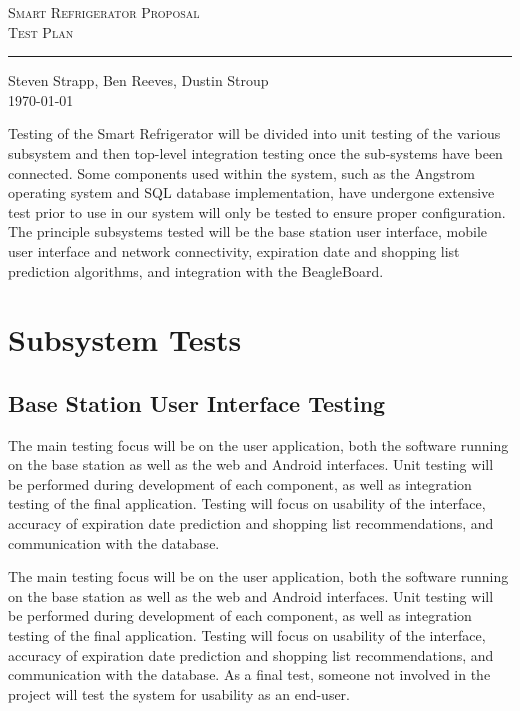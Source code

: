 \documentclass[11pt,letterpaper]{article}
\begin{document}
\begin{center}
\huge
\textsc{Smart Refrigerator Proposal}\\
\Large
\textsc{Test Plan} \\
\vspace{.20cm}
\hrule
\vspace{.40cm}
\normalsize
Steven Strapp, Ben Reeves, Dustin Stroup \\
\today \\
\vspace{1cm}
\end{center}
Testing of the Smart Refrigerator will be divided into unit testing of the various subsystem and then top-level integration testing once the sub-systems have been connected. Some components used within the system, such as the Angstrom operating system and SQL database implementation, have undergone extensive test prior to use in our system will only be tested to ensure proper configuration. The principle subsystems tested will be the base station user interface, mobile user interface and network connectivity, expiration date and shopping list prediction algorithms, and integration with the BeagleBoard.
\newline \quad \newline

\section{Subsystem Tests}
\subsection{Base Station User Interface Testing}
The main testing focus will be on the user application, both the software running on the base station as well as the web and Android interfaces.  Unit testing will be performed during development of each component, as well as integration testing of the final application.  Testing will focus on usability of the interface, accuracy of expiration date prediction and shopping list recommendations, and communication with the database. 


The main testing focus will be on the user application, both the software running on the base station as well as the web and Android interfaces.  Unit testing will be performed during development of each component, as well as integration testing of the final application.  Testing will focus on usability of the interface, accuracy of expiration date prediction and shopping list recommendations, and communication with the database. 
\newline \quad \newline
As a final test, someone not involved in the project will test the system for usability as an end-user.
\end{document}
